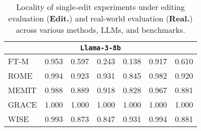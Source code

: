 \begin{table}[t]
\begin{adjustbox}{max width=\linewidth}
\begin{tabular}{lcc cc cc}
    \multicolumn{7}{c}{\texttt{\textbf{Llama-3-8b}}} \\
    \midrule
    FT-M & \num{0.953} & \num{0.597} & \num{0.243} & \num{0.138} & \num{0.917}   & \num{0.610} \\
    ROME & \num{0.994} & \num{0.923} & \num{0.931} & \num{0.845} & \num{0.982}   & \num{0.920} \\
    MEMIT & \num{0.988} & \num{0.889} & \num{0.918} & \num{0.828} & \num{0.967}   & \num{0.881} \\
    GRACE & \num{1.000} & \num{1.000} & \num{1.000} & \num{1.000} & \num{1.000}   & \num{1.000} \\
    WISE & \num{0.993} & \num{0.873} & \num{0.847} & \num{0.931} & \num{0.994}   & \num{0.881} \\
        \bottomrule 
    \end{tabular}
    \end{adjustbox}
    \caption{Locality of single-edit experiments under editing evaluation (\textbf{Edit.}) and real-world evaluation (\textbf{Real.}) across various methods, LLMs, and benchmarks.} 
    \label{tab:single_loc}
\end{table}
